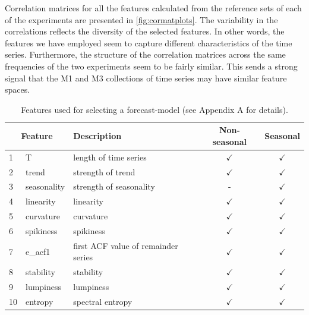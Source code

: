 \documentclass[11pt,a4paper,]{article}
\def\yes{$\checkmark$}
\begin{document}
Correlation matrices for all the features calculated from the reference sets of each of the experiments are presented in \autoref{fig:cormatplots}. The variability in the correlations reflects the diversity of the selected features. In other words, the features we have employed seem to capture different characteristics of the time series. Furthermore, the structure of the correlation matrices across the same frequencies of the two experiments seem to be fairly similar. This sends a strong signal that the M1 and M3 collections of time series may have similar feature spaces.

\begin{table}[!htp]
\centering\footnotesize\tabcolsep=0.12cm
\caption{Features used for selecting a forecast-model (see Appendix A for details).}
\label{feature}
\begin{tabular}{llp{}cc}
\toprule
\multicolumn{2}{c}{Feature} & Description & Non-seasonal & Seasonal\\
\midrule
1  & T              & length of time series                                                                   & \yes  & \yes \\
2  & trend          & strength of trend                                                                       & \yes  & \yes\\
3  & seasonality    & strength of seasonality                                                                 & -     & \yes \\
4  & linearity      & linearity                                                                               & \yes  & \yes \\
5  & curvature      & curvature                                                                               & \yes  & \yes \\
6  & spikiness      & spikiness                                                                               & \yes  & \yes \\
7  & e\_acf1        & first ACF value of remainder series                                                     & \yes  & \yes \\
8  & stability      & stability                                                                               & \yes  & \yes \\
9  & lumpiness      & lumpiness                                                                               & \yes  & \yes \\
10 & entropy        & spectral entropy                                                                        & \yes  & \yes \\

\end{tabular}
\end{table}
\end{document}
